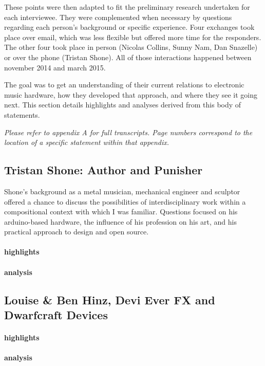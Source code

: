 These points were then adapted to fit the preliminary research undertaken for each interviewee. They were complemented when necessary by questions regarding each person's background or specific experience. Four exchanges took place over email, which was less flexible but offered more time for the responders. The other four took place in person (Nicolas Collins, Sunny Nam, Dan Snazelle) or over the phone (Tristan Shone). All of those interactions happened between november 2014 and march 2015. 

The goal was to get an understanding of their current relations to electronic music hardware, how they developed that approach, and where they see it going next. This section details highlights and analyses derived from this body of statements. 

\emph{Please refer to appendix A for full transcripts. Page numbers correspond to the location of a specific statement within that appendix. }

\subsection{Tristan Shone: Author and Punisher}

Shone's background as a metal musician, mechanical engineer and sculptor offered a chance to discuss the possibilities of interdisciplinary work within a compositional context with which I was familiar. Questions focused on his arduino-based hardware, the influence of his profession on his art, and his practical approach to design and open source. 

\paragraph{highlights}

 

\paragraph{analysis}



\subsection{Louise \& Ben Hinz, Devi Ever FX and Dwarfcraft Devices}
\paragraph{highlights}
\paragraph{analysis}

